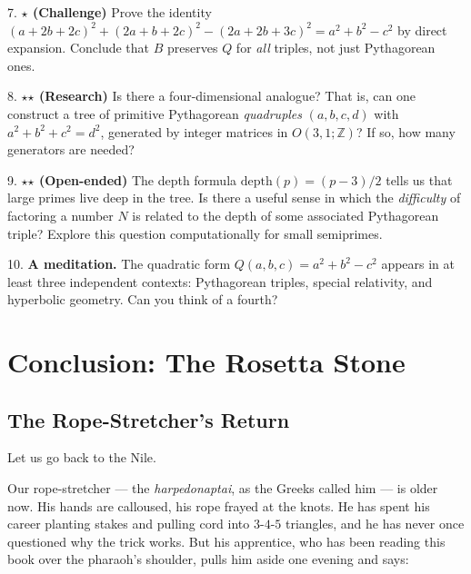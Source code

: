\documentclass[11pt,openright,twoside]{book}
\theoremstyle{definition}
\begin{document}
7. \textbf{{$\star$} (Challenge)} Prove the identity $(a + 2b + 2c)^2 + (2a + b + 2c)^2 - (2a + 2b + 3c)^2 = a^2 + b^2 - c^2$ by direct expansion. Conclude that $B$ preserves $Q$ for \textit{all} triples, not just Pythagorean ones.

8. \textbf{{$\star$}{$\star$} (Research)} Is there a four-dimensional analogue? That is, can one construct a tree of primitive Pythagorean \textit{quadruples} $(a, b, c, d)$ with $a^2 + b^2 + c^2 = d^2$, generated by integer matrices in $O(3,1; \mathbb{Z})$? If so, how many generators are needed?

9. \textbf{{$\star$}{$\star$} (Open-ended)} The depth formula $\text{depth}(p) = (p-3)/2$ tells us that large primes live deep in the tree. Is there a useful sense in which the \textit{difficulty} of factoring a number $N$ is related to the depth of some associated Pythagorean triple? Explore this question computationally for small semiprimes.

10. \textbf{A meditation.} The quadratic form $Q(a, b, c) = a^2 + b^2 - c^2$ appears in at least three independent contexts: Pythagorean triples, special relativity, and hyperbolic geometry. Can you think of a fourth?

\clearpage


\chapter*{Conclusion: The Rosetta Stone}



\bigskip


\section{The Rope-Stretcher's Return}

Let us go back to the Nile.

Our rope-stretcher --- the \textit{harpedonaptai}, as the Greeks called him --- is older now. His hands are calloused, his rope frayed at the knots. He has spent his career planting stakes and pulling cord into $3$-$4$-$5$ triangles, and he has never once questioned why the trick works. But his apprentice, who has been reading this book over the pharaoh's shoulder, pulls him aside one evening and says:
\end{document}
